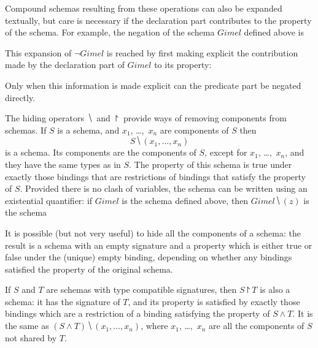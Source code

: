 Compound schemas resulting from these operations can also be
expanded textually,
but care is necessary if the declaration part contributes to the
property of the schema.
For example, the negation of the schema $Gimel$ defined above is
\new This expansion of $\lnot Gimel$ is reached by first making
explicit the contribution made by the declaration part of $Gimel$ to
its property:
Only when this information is made explicit can the predicate part be
negated directly.

The hiding operators $\hide$ and $\project$
provide ways of removing components from schemas. If $S$ is a
schema, and $x_1$, \dots,~$x_n$ are components of $S$ then
\[ S \hide (x_1, \ldots, x_n) \]
is a schema. Its components are the components of $S$, except
for $x_1$, \ldots,~$x_n$, and they have the same types as in
$S$. The property of this schema is true under exactly those
bindings that are restrictions of bindings that satisfy the property
of $S$. Provided there is no clash of variables, the schema can be written
using an existential quantifier: if $Gimel$ is the schema defined above,
then $Gimel \hide (z)$ is the schema
It is possible (but not very useful) to hide all the components of a
schema: the result is a schema with an empty signature and a property
which is either true or false under the (unique) empty binding,
depending on whether any bindings satisfied the property of the
original schema.

If $S$ and $T$ are schemas with type compatible signatures, then $S
\project T$ is also a schema: it has the signature of $T$, and its
property is satisfied by exactly those bindings which are a
restriction of a binding satisfying the property of $S \land T$. It
is the same as $(S \land T) \hide (x_1, \ldots, x_n)$, where $x_1$,
\dots,~$x_n$ are all the components of $S$ not shared by $T$.

